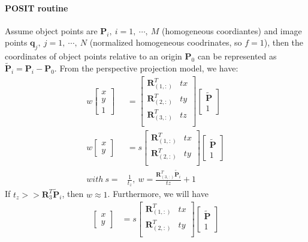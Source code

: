 \documentclass[a4paper]{report}
\begin{document}
\paragraph{POSIT routine}
Assume object points are  $\mathbf{P}_i,\ i=1,\ \cdots,\ M$ (homogeneous coordiantes) and image points $\mathbf{q}_j,\ j=1,\ \cdots,\ N$ (normalized homogeneous coodrinates, so $f=1$), then the coordinates of object points relative to an origin $\mathbf{P}_0$ can be represented as $\tilde{\mathbf{P}}_i=\mathbf{P}_i-\mathbf{P}_0$. From the perspective projection model, we have:
\begin{align*}
w\left[
\begin{matrix}
x \\ y \\ 1
\end{matrix}\right]&=\left[
\begin{matrix}
\mathbf{R}_{(1,:)}^T & tx \\ 
\mathbf{R}_{(2,:)}^T & ty \\ 
\mathbf{R}_{(3,:)}^T & tz \\ 
\end{matrix}
\right]
\left[
\begin{matrix}
\tilde{\mathbf{P}} \\ 1
\end{matrix}
\right] \\
w\left[
\begin{matrix}
x \\ y 
\end{matrix}\right]&=s
\left[
\begin{matrix}
\mathbf{R}_{(1,:)}^T & tx \\ 
\mathbf{R}_{(2,:)}^T & ty \\ 
\end{matrix}
\right]
\left[
\begin{matrix}
\tilde{\mathbf{P}} \\ 1
\end{matrix}
\right] \\
with\ s=&\frac{1}{t_z},\ w=\frac{\mathbf{R}_{(3,:)}^T\tilde{\mathbf{P}}_i}{tz}+1
\end{align*}
If $t_z >> \mathbf{R}_3^T\tilde{\mathbf{P}}_i$, then $w \approx 1$. Furthermore, we will have 
\begin{align*}
\left[
\begin{matrix}
x \\ y 
\end{matrix}\right]&=s
\left[
\begin{matrix}
\mathbf{R}_{(1,:)}^T & tx \\ 
\mathbf{R}_{(2,:)}^T & ty \\ 
\end{matrix}
\right]
\left[
\begin{matrix}
\tilde{\mathbf{P}} \\ 1
\end{matrix}
\right]
\end{align*}
\end{document}

